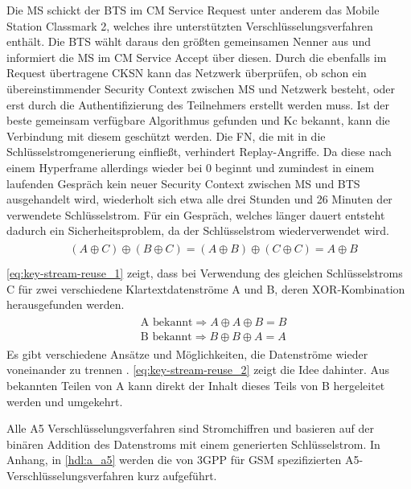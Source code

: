 Die \ac{MS} schickt der \ac{BTS} im \ac{CM} Service Request  unter anderem das Mobile Station Classmark 2, welches ihre unterstützten Verschlüsselungsverfahren enthält. Die \ac{BTS} wählt daraus den größten gemeinsamen Nenner aus und informiert die \ac{MS} im \ac{CM} Service Accept  über diesen. Durch die ebenfalls im Request übertragene \ac{CKSN} kann das Netzwerk überprüfen, ob schon ein übereinstimmender Security Context zwischen \ac{MS} und Netzwerk besteht, oder erst durch die Authentifizierung des Teilnehmers erstellt werden muss. Ist der beste gemeinsam verfügbare Algorithmus gefunden und \ac{Kc} bekannt, kann die Verbindung mit diesem geschützt werden. Die \ac{FN}, die mit in die Schlüsselstromgenerierung einfließt, verhindert Replay-Angriffe. Da diese nach einem Hyperframe allerdings wieder bei 0 beginnt und zumindest in einem laufenden Gespräch kein neuer Security Context zwischen \ac{MS} und \ac{BTS} ausgehandelt wird, wiederholt sich etwa alle drei Stunden und 26 Minuten der verwendete Schlüsselstrom. Für ein Gespräch, welches länger dauert entsteht dadurch ein Sicherheitsproblem, da der Schlüsselstrom wiederverwendet wird.
\begin{align}\label{eq:key-stream-reuse_1}
\begin{split}
&(A \oplus C) \oplus (B \oplus C) = (A \oplus B) \oplus (C \oplus C) = A \oplus B \\
\end{split}
\end{align}\noindent
\autoref{eq:key-stream-reuse_1} zeigt, dass bei Verwendung des gleichen Schlüsselstroms C für zwei verschiedene Klartextdatenströme A und B, deren \ac{XOR}-Kombination herausgefunden werden.
\begin{align}\label{eq:key-stream-reuse_2}
\begin{split}
&\text{A bekannt} \Rightarrow A \oplus A \oplus B  = B \\
&\text{B bekannt} \Rightarrow B \oplus B \oplus A = A 
\end{split}
\end{align}
Es gibt verschiedene Ansätze und Möglichkeiten, die Datenströme wieder voneinander zu trennen \citep[Kap. 3]{borisov2001intercepting}. \autoref{eq:key-stream-reuse_2} zeigt die Idee dahinter. Aus bekannten Teilen von A kann direkt der Inhalt dieses Teils von B hergeleitet werden und umgekehrt. 

Alle \ac{A5} Verschlüsselungsverfahren sind Stromchiffren und basieren auf der binären Addition des Datenstroms mit einem generierten Schlüsselstrom. In Anhang, in \autoref{hdl:a_a5} werden die von \ac{3GPP} für \ac{GSM} spezifizierten \ac{A5}-Verschlüsselungsverfahren kurz aufgeführt.

